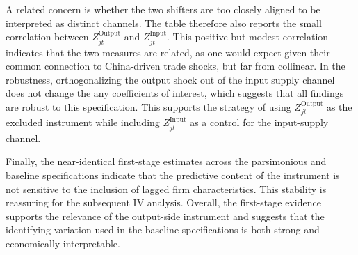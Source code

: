 \documentclass[12pt]{article}
\begin{document}
A related concern is whether the two shifters are too closely aligned to be interpreted as distinct channels. The table therefore also reports the small correlation between \(Z^{\text{Output}}_{jt}\) and \(Z^{\text{Input}}_{jt}\). This positive but modest correlation indicates that the two measures are related, as one would expect given their common connection to China-driven trade shocks, but far from collinear. In the robustness, orthogonalizing the output shock out of the input supply channel does not change the any coefficients of interest, which suggests that all findings are robust to this specification. This supports the strategy of using \(Z^{\text{Output}}_{jt}\) as the excluded instrument while including \(Z^{\text{Input}}_{jt}\) as a control for the input-supply channel.

Finally, the near-identical first-stage estimates across the parsimonious and baseline specifications indicate that the predictive content of the instrument is not sensitive to the inclusion of lagged firm characteristics. This stability is reassuring for the subsequent IV analysis. Overall, the first-stage evidence supports the relevance of the output-side instrument and suggests that the identifying variation used in the baseline specifications is both strong and economically interpretable.
\end{document}
